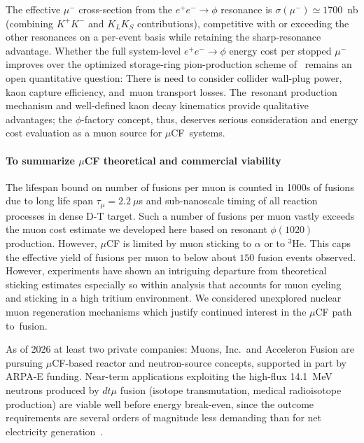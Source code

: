 \documentclass[particles,article,accept,pdftex,moreauthors]{Definitions/mdpi}
\begin{document}
The effective $\mu^-$ cross-section from the $e^+e^-\to \phi$ resonance is $\sigma(\mu^-)\simeq 1700$~nb (combining $K^+K^-$ and $K_LK_S$ contributions), competitive with or exceeding the other resonances on a per-event basis while retaining the sharp-resonance advantage. Whether the full system-level $e^+e^-\to \phi$ energy cost per stopped $\mu^-$ improves over the optimized storage-ring pion-production scheme of~\cite{Rafelski:1991DOE} remains an open quantitative question: There is need to consider collider wall-plug power, kaon capture efficiency, and~muon transport losses. The~resonant production mechanism and well-defined kaon decay kinematics provide qualitative advantages; the $\phi$-factory concept, thus, deserves serious consideration and energy cost evaluation as a muon source for $\mu$CF~systems.

\vspace{-6pt}\paragraph*{\bf To summarize $\mu$CF theoretical and commercial viability}
The lifespan bound on number of fusions per muon is counted in 1000s of fusions due to long life span $\tau_\mu=2.2~\mu$s and sub-nanoscale timing of all reaction processes in dense D-T target. Such a number of fusions per muon vastly exceeds the muon cost estimate we developed here based on resonant $\phi(1020)$ production. However, $\mu$CF is limited by muon sticking to $\alpha$ or to ${}^3\mathrm{He}$. This caps the effective yield of fusions per muon to below about $150$ fusion events observed. However, experiments have shown an intriguing departure from theoretical sticking estimates especially so within analysis that accounts for muon cycling and sticking in a high tritium environment. We considered unexplored nuclear muon regeneration mechanisms which justify continued interest in the $\mu$CF path to~fusion.

As of 2026 at least two private companies: Muons, Inc.\ and Acceleron Fusion are pursuing $\mu$CF-based reactor and neutron-source concepts, supported in part by ARPA-E funding. Near-term applications exploiting the high-flux 14.1~MeV neutrons produced by $dt\mu$ fusion (isotope transmutation, medical radioisotope production) are viable well before energy break-even, since the outcome requirements are several orders of magnitude less demanding than for net electricity generation~\cite{Kamimura:2021msf,Yamashita:2022rtu}. 

\end{document}
